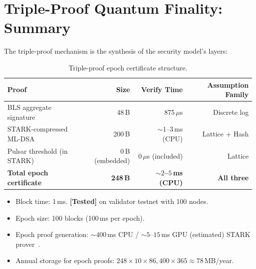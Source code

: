\section{Triple-Proof Quantum Finality: Summary}

\label{sec:triple-proof}

The triple-proof mechanism is the synthesis of the security model's layers:

\begin{table}[ht]
\centering
\caption{Triple-proof epoch certificate structure.}
\label{tab:triple-proof}
\begin{tabular}{lrrr}
\toprule
\textbf{Proof} & \textbf{Size} & \textbf{Verify Time} & \textbf{Assumption Family} \\
\midrule
BLS aggregate signature & 48\,B & 875\,$\mu$s & Discrete log \\
STARK-compressed ML-DSA & 200\,B & ${\sim}1$--$3$\,ms (CPU) & Lattice + Hash \\
Pulsar threshold (in STARK) & 0\,B (embedded) & 0\,$\mu$s (included) & Lattice \\
\midrule
\textbf{Total epoch certificate} & \textbf{248\,B} & \textbf{${\sim}2$--$5$\,ms (CPU)} & \textbf{All three} \\
\bottomrule
\end{tabular}
\end{table}

\begin{itemize}[leftmargin=2em]
  \item Block time: 1\,ms. \textbf{[Tested]} on validator testnet with 100 nodes.
  \item Epoch size: 100 blocks (100\,ms per epoch).
  \item Epoch proof generation: ${\sim}400$\,ms CPU / ${\sim}5$--$15$\,ms GPU (estimated) STARK prover~\cite{lux-benchmarks}.
  \item Annual storage for epoch proofs: $248 \times 10 \times 86{,}400 \times 365
        \approx 78$\,MB/year.
\end{itemize}

